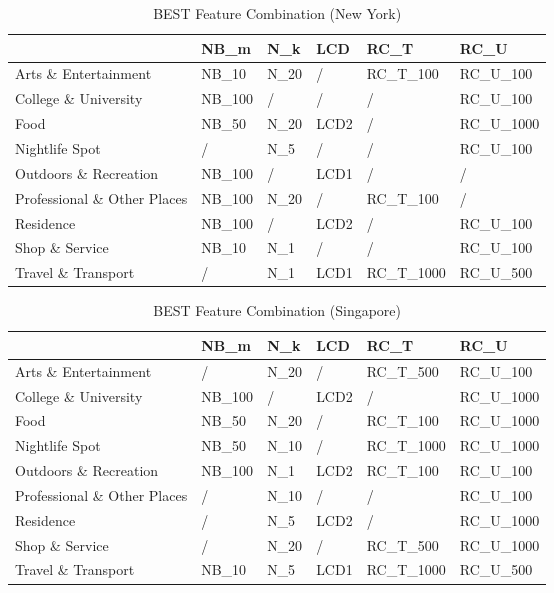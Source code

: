 \begin{table}[ht]
\caption{BEST Feature Combination (New York)}
\centering
\label{tab:comNew}
\begin{tabular}{llllll}
\hline
&  NB\_m  &  N\_k  &  LCD  &  RC\_T  &  RC\_U \\
\hline
Arts \&   Entertainment  &  NB\_10  &  N\_20  &  /  &  RC\_T\_100  &  RC\_U\_100\\
College \&   University  &  NB\_100  &  /  &  /  &  /  &  RC\_U\_100\\
Food  &  NB\_50  &  N\_20  &  LCD2  &  /  &  RC\_U\_1000\\
Nightlife Spot  &  /  &  N\_5  &  /  &  /  &  RC\_U\_100\\
Outdoors \&   Recreation  &  NB\_100  &  /  &  LCD1  &  /  &  /\\
Professional \&   Other Places  &  NB\_100  &  N\_20  &  /  &  RC\_T\_100  &  /\\
Residence  &  NB\_100  &  /  &  LCD2  &  /  &  RC\_U\_100\\
Shop \&   Service  &  NB\_10  &  N\_1  &  /  &  /  &  RC\_U\_100\\
Travel \&   Transport  &  /  &  N\_1  &  LCD1  &  RC\_T\_1000  &  RC\_U\_500\\

\hline
\end{tabular}
\end{table}

\begin{table}[ht]
\caption{BEST Feature Combination (Singapore)}
\centering
\label{tab:comSg}
\begin{tabular}{llllll}
\hline
& NB\_m & N\_k & LCD & RC\_T & RC\_U\\
\hline
Arts \& Entertainment & / & N\_20 & / & RC\_T\_500 & RC\_U\_100\\
College \& University & NB\_100 & / & LCD2 & / & RC\_U\_1000\\
Food & NB\_50 & N\_20 & / & RC\_T\_100 & RC\_U\_1000\\
Nightlife Spot & NB\_50 & N\_10 & / & RC\_T\_1000 & RC\_U\_1000\\
Outdoors \& Recreation & NB\_100 & N\_1 & LCD2 & RC\_T\_100 & RC\_U\_100\\
Professional \& Other Places & / & N\_10 & / & / & RC\_U\_100\\
Residence & / & N\_5 & LCD2 & / & RC\_U\_1000\\
Shop \& Service & / & N\_20 & / & RC\_T\_500 & RC\_U\_1000\\
Travel \& Transport & NB\_10 & N\_5 & LCD1 & RC\_T\_1000 & RC\_U\_500\\
\hline
\end{tabular}
\end{table}

